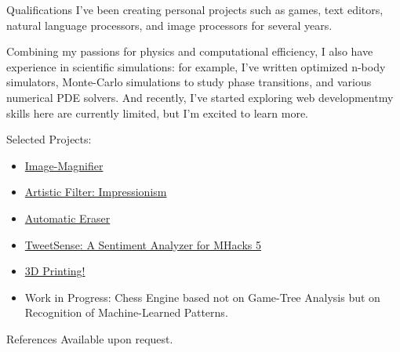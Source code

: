 \documentclass[12pt]{article}
\begin{document}
\begin{section}{Qualifications}
  I've been creating personal projects such as games, text editors, natural language processors, and image processors for several years. 
  
  Combining my passions for physics and computational efficiency, I also have experience in scientific simulations: for example, I've written optimized n-body simulators, Monte-Carlo simulations to study phase transitions, and various numerical PDE solvers. And recently, I've started exploring web development\textemdash my skills here are
  currently limited, but I'm excited to learn more.

  Selected Projects:
  \begin{itemize}
   \item \href{http://sctenka.blogspot.com/2013/08/magnification-art.html}{Image-Magnifier}
   \item \href{http://sctenka.blogspot.com/2014/06/impression.html}{Artistic Filter: Impressionism}
   \item \href{http://sctenka.blogspot.com/2014/07/paper.html}{Automatic Eraser}
   \item \href{http://tweetsense.herokuapp.com/}{TweetSense: A Sentiment Analyzer for MHacks 5}
   \item \href{http://sctenka.blogspot.ch/2015/08/red-ball.html}{3D Printing!}
   \item Work in Progress: Chess Engine based not on Game-Tree Analysis but on Recognition of Machine-Learned Patterns.
  \end{itemize}
\end{section}

\begin{section}{References}
 Available upon request.
\end{section}
\end{document}
